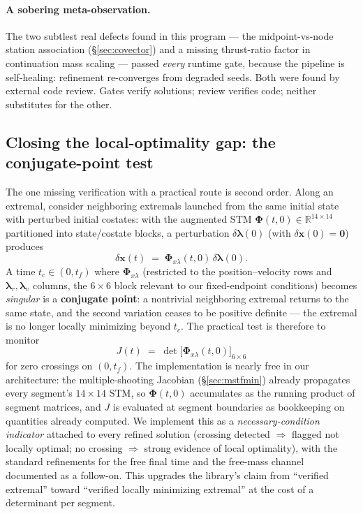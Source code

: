 \documentclass[11pt]{article}
\newcommand{\lr}{\bm{\lambda}_r}
\newcommand{\lv}{\bm{\lambda}_v}
\begin{document}
\paragraph{A sobering meta-observation.} The two subtlest real defects
found in this program --- the midpoint-vs-node station association
(\S\ref{sec:covector}) and a missing thrust-ratio factor in continuation
mass scaling --- passed \emph{every} runtime gate, because the pipeline is
self-healing: refinement re-converges from degraded seeds. Both were found
by external code review. Gates verify solutions; review verifies code;
neither substitutes for the other.

\subsection{Closing the local-optimality gap: the conjugate-point test}
\label{sec:conjugate}

The one missing verification with a practical route is second order. Along
an extremal, consider neighboring extremals launched from the same initial
state with perturbed initial costates: with the augmented STM
$\bm\Phi(t,0)\in\mathbb{R}^{14\times14}$ partitioned into state/costate
blocks, a perturbation $\delta\bm\lambda(0)$ (with
$\delta\bm x(0)=\bm 0$) produces
\begin{equation}
\delta\bm x(t) \;=\; \bm\Phi_{x\lambda}(t,0)\,\delta\bm\lambda(0).
\end{equation}
A time $t_c\in(0,t_f)$ where $\bm\Phi_{x\lambda}$ (restricted to the
position--velocity rows and $\lr,\lv$ columns, the $6\times6$ block
relevant to our fixed-endpoint conditions) becomes \emph{singular} is a
\textbf{conjugate point}: a nontrivial neighboring extremal returns to the
same state, and the second variation ceases to be positive definite ---
the extremal is no longer locally minimizing beyond $t_c$. The practical
test is therefore to monitor
\begin{equation}
J(t) \;=\; \det\!\big[\bm\Phi_{x\lambda}(t,0)\big]_{6\times6}
\end{equation}
for zero crossings on $(0, t_f)$. The implementation is nearly free in our
architecture: the multiple-shooting Jacobian (\S\ref{sec:mstfmin}) already
propagates every segment's $14\times14$ STM, so $\bm\Phi(t,0)$ accumulates
as the running product of segment matrices, and $J$ is evaluated at
segment boundaries as bookkeeping on quantities already computed. We
implement this as a \emph{necessary-condition indicator} attached to every
refined solution (crossing detected $\Rightarrow$ flagged not locally
optimal; no crossing $\Rightarrow$ strong evidence of local optimality),
with the standard refinements for the free final time and the free-mass
channel documented as a follow-on. This upgrades the library's claim from
``verified extremal'' toward ``verified locally minimizing extremal'' at
the cost of a determinant per segment.
\end{document}
